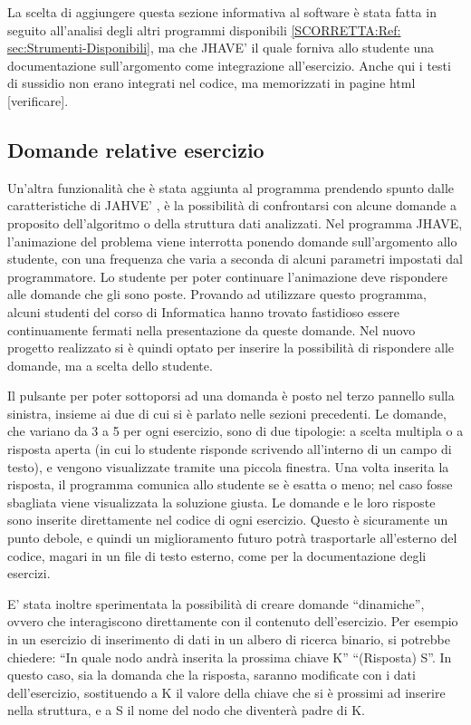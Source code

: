 La scelta di aggiungere questa sezione informativa al software è stata
fatta in seguito all'analisi degli altri programmi disponibili \ref{SCORRETTA:Ref: sec:Strumenti-Disponibili},
ma che JHAVE' \cite{JHAVE} il quale forniva allo studente una documentazione
sull'argomento come integrazione all'esercizio. Anche qui i testi
di sussidio non erano integrati nel codice, ma memorizzati in pagine
html {[}verificare{]}.


\subsection{\label{sub:Domande-relative-esercizio}Domande relative esercizio}

Un'altra funzionalità che è stata aggiunta al programma prendendo
spunto dalle caratteristiche di JAHVE' \cite{JHAVE}, è la possibilità
di confrontarsi con alcune domande a proposito dell'algoritmo o della
struttura dati analizzati. Nel programma JHAVE, l'animazione del problema
viene interrotta ponendo domande sull'argomento allo studente, con
una frequenza che varia a seconda di alcuni parametri impostati dal
programmatore. Lo studente per poter continuare l'animazione deve
rispondere alle domande che gli sono poste. Provando ad utilizzare
questo programma, alcuni studenti del corso di Informatica hanno trovato
fastidioso essere continuamente fermati nella presentazione da queste
domande. Nel nuovo progetto realizzato si è quindi optato per inserire
la possibilità di rispondere alle domande, ma a scelta dello studente.

Il pulsante per poter sottoporsi ad una domanda è posto nel terzo
pannello sulla sinistra, insieme ai due di cui si è parlato nelle
sezioni precedenti. Le domande, che variano da 3 a 5 per ogni esercizio,
sono di due tipologie: a scelta multipla o a risposta aperta (in cui
lo studente risponde scrivendo all'interno di un campo di testo),
e vengono visualizzate tramite una piccola finestra. Una volta inserita
la risposta, il programma comunica allo studente se è esatta o meno;
nel caso fosse sbagliata viene visualizzata la soluzione giusta. Le
domande e le loro risposte sono inserite direttamente nel codice di
ogni esercizio. Questo è sicuramente un punto debole, e quindi un
miglioramento futuro potrà trasportarle all'esterno del codice, magari
in un file di testo esterno, come per la documentazione degli esercizi.

E' stata inoltre sperimentata la possibilità di creare domande {}``dinamiche'',
ovvero che interagiscono direttamente con il contenuto dell'esercizio.
Per esempio in un esercizio di inserimento di dati in un albero di
ricerca binario, si potrebbe chiedere: {}``In quale nodo andrà inserita
la prossima chiave K'' {}``(Risposta) S''. In questo caso, sia
la domanda che la risposta, saranno modificate con i dati dell'esercizio,
sostituendo a K il valore della chiave che si è prossimi ad inserire
nella struttura, e a S il nome del nodo che diventerà padre di K.


